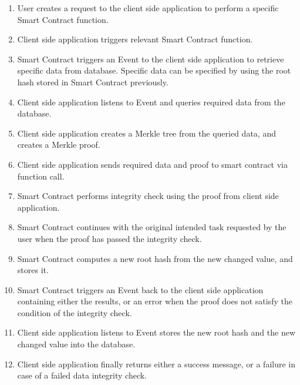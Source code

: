 \begin{enumerate}
\item User creates a request to the client side application to perform a specific Smart Contract function. 
\item Client side application triggers relevant Smart Contract function.
\item Smart Contract triggers an Event to the client side application to retrieve specific data from database. Specific data can be specified by using the root hash stored in Smart Contract previously.
\item Client side application listens to Event and queries required data from the database.
\item Client side application creates a Merkle tree from the queried data, and creates a Merkle proof.
\item Client side application sends required data and proof to smart contract via function call.
\item Smart Contract performs integrity check using the proof from client side application.
\item Smart Contract continues with the original intended task requested by the user when the proof has passed the integrity check. 
\item Smart Contract computes a new root hash from the new changed value, and stores it.
\item Smart Contract triggers an Event back to the client side application containing either the results, or an error when the proof does not satisfy the condition of the integrity check. 
\item Client side application listens to Event stores the new root hash and the new changed value into the database. 
\item Client side application finally returns either a success message, or a failure in case of a failed data integrity check. 
\end{enumerate}
